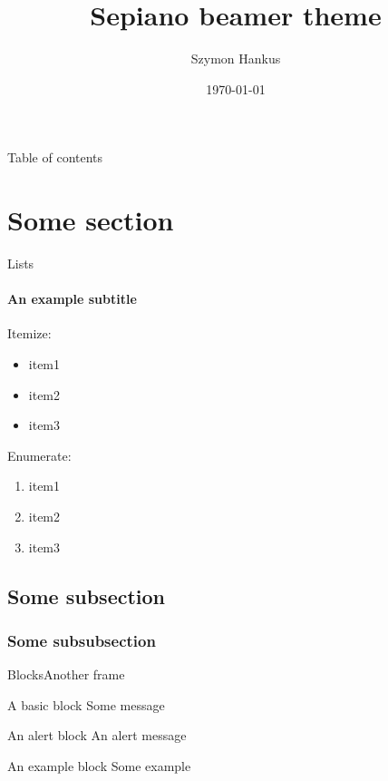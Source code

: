 \documentclass[xcolor=dvipsnames]{beamer}
\title{Sepiano beamer theme}
\author{Szymon Hankus}
\date{\today}
\begin{document}
    \frame{\titlepage}
        \begin{frame}{Table of contents}
        \tableofcontents
    \end{frame}

    \section{Some section}
    \begin{frame}{Lists}
        \framesubtitle{An example subtitle}
        Itemize:
        \begin{itemize}
            \item item1
            \item item2
            \item item3
        \end{itemize}
        Enumerate:
        \begin{enumerate}
            \item item1
            \item item2
            \item item3
        \end{enumerate}
    \end{frame}

    \subsection{Some subsection}
    \subsubsection{Some subsubsection}
    \begin{frame}{Blocks}{Another frame}
        \begin{block}{A basic block}
          Some message
        \end{block}
        \begin{alertblock}{An alert block}
          An alert message
        \end{alertblock}
        \begin{exampleblock}{An example block}
          Some example
        \end{exampleblock}
    \end{frame}
    
\end{document}
